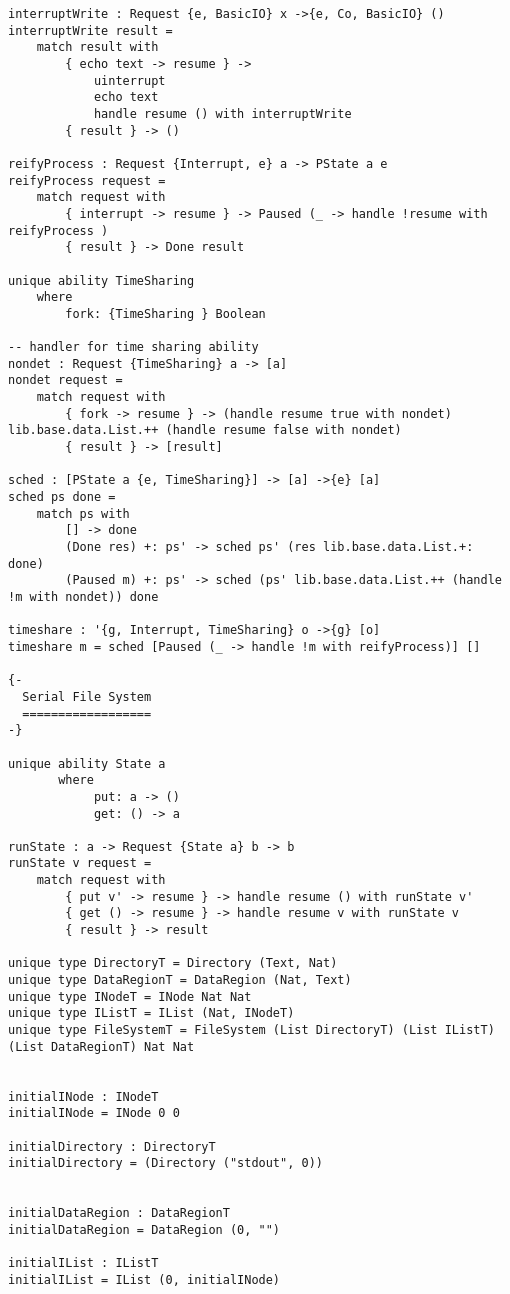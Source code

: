 \documentclass[logo,bsc,singlespacing,parskip]{infthesis}
\begin{document}
\begin{lstlisting}[language=unison]
interruptWrite : Request {e, BasicIO} x ->{e, Co, BasicIO} ()
interruptWrite result =
    match result with
        { echo text -> resume } -> 
            uinterrupt
            echo text 
            handle resume () with interruptWrite
        { result } -> ()

reifyProcess : Request {Interrupt, e} a -> PState a e
reifyProcess request =
    match request with
        { interrupt -> resume } -> Paused (_ -> handle !resume with reifyProcess )
        { result } -> Done result

unique ability TimeSharing
    where
        fork: {TimeSharing } Boolean

-- handler for time sharing ability
nondet : Request {TimeSharing} a -> [a]
nondet request =
    match request with
        { fork -> resume } -> (handle resume true with nondet) lib.base.data.List.++ (handle resume false with nondet)
        { result } -> [result]

sched : [PState a {e, TimeSharing}] -> [a] ->{e} [a]
sched ps done = 
    match ps with
        [] -> done
        (Done res) +: ps' -> sched ps' (res lib.base.data.List.+: done)
        (Paused m) +: ps' -> sched (ps' lib.base.data.List.++ (handle !m with nondet)) done

timeshare : '{g, Interrupt, TimeSharing} o ->{g} [o]
timeshare m = sched [Paused (_ -> handle !m with reifyProcess)] []

{-
  Serial File System
  ==================
-}

unique ability State a
       where
            put: a -> ()
            get: () -> a

runState : a -> Request {State a} b -> b
runState v request =
    match request with
        { put v' -> resume } -> handle resume () with runState v'
        { get () -> resume } -> handle resume v with runState v
        { result } -> result

unique type DirectoryT = Directory (Text, Nat)
unique type DataRegionT = DataRegion (Nat, Text)
unique type INodeT = INode Nat Nat
unique type IListT = IList (Nat, INodeT)
unique type FileSystemT = FileSystem (List DirectoryT) (List IListT) (List DataRegionT) Nat Nat


initialINode : INodeT
initialINode = INode 0 0

initialDirectory : DirectoryT
initialDirectory = (Directory ("stdout", 0))


initialDataRegion : DataRegionT
initialDataRegion = DataRegion (0, "")

initialIList : IListT
initialIList = IList (0, initialINode)


\end{lstlisting}
\end{document}

